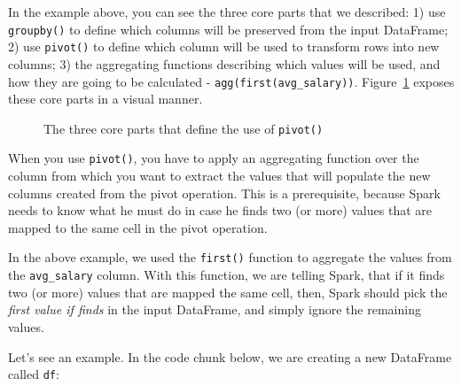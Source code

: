 \documentclass[
  11pt,
  letterpaper,
  DIV=11,
  numbers=noendperiod]{scrreprt}
\begin{document}
In the example above, you can see the three core parts that we
described: 1) use \texttt{groupby()} to define which columns will be
preserved from the input DataFrame; 2) use \texttt{pivot()} to define
which column will be used to transform rows into new columns; 3) the
aggregating functions describing which values will be used, and how they
are going to be calculated -
\texttt{agg(first(\textquotesingle{}avg\_salary\textquotesingle{}))}.
Figure~\ref{fig-pivot2} exposes these core parts in a visual manner.

\begin{figure}


\caption{\label{fig-pivot2}The three core parts that define the use of
\texttt{pivot()}}

\end{figure}%

When you use \texttt{pivot()}, you have to apply an aggregating function
over the column from which you want to extract the values that will
populate the new columns created from the pivot operation. This is a
prerequisite, because Spark needs to know what he must do in case he
finds two (or more) values that are mapped to the same cell in the pivot
operation.

In the above example, we used the \texttt{first()} function to aggregate
the values from the \texttt{avg\_salary} column. With this function, we
are telling Spark, that if it finds two (or more) values that are mapped
the same cell, then, Spark should pick the \emph{first value if finds}
in the input DataFrame, and simply ignore the remaining values.

Let's see an example. In the code chunk below, we are creating a new
DataFrame called \texttt{df}:
\end{document}
